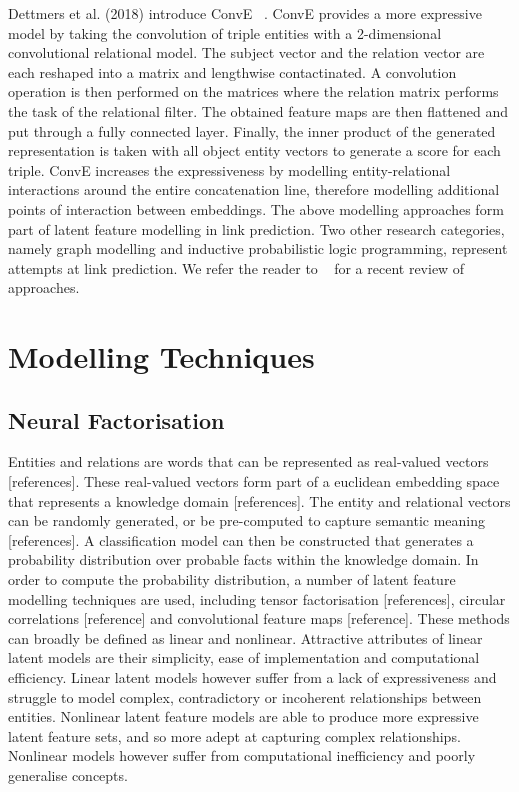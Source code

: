 Dettmers et al. (2018) introduce ConvE ~\citep{dettmers2018convolutional}. ConvE provides a more expressive model by taking the convolution of triple entities with a 2-dimensional convolutional relational model. The subject vector and the relation vector are each reshaped into a matrix and lengthwise contactinated. A convolution operation is then performed on the matrices where the relation matrix performs the task of the relational filter. The obtained feature maps are then flattened and put through a fully connected layer. Finally, the inner product of the generated representation is taken with all object entity vectors to generate a score for each triple. ConvE  increases the expressiveness by modelling entity-relational interactions  around the entire concatenation line, therefore modelling additional points of interaction between embeddings. \newline
The above modelling approaches form part of latent feature modelling in link prediction. Two other research categories, namely graph modelling and inductive probabilistic logic programming, represent attempts at link prediction. We refer the reader to ~\citep{nickel2015review} for a recent review of approaches. 



\section{Modelling Techniques} %

\subsection{Neural Factorisation} %
Entities and relations are words that can be represented as real-valued vectors [references]. These real-valued vectors form part of a euclidean embedding space that represents a knowledge domain [references]. The entity and relational vectors can be randomly generated, or be pre-computed to capture semantic meaning [references]. A classification model can then be constructed that generates a probability distribution over probable facts within the knowledge domain. In order to compute the probability distribution, a number of latent feature modelling techniques are used, including tensor factorisation [references], circular correlations [reference] and convolutional feature maps [reference]. These methods can broadly be defined as linear and nonlinear. Attractive attributes of linear latent models are their simplicity, ease of implementation and computational efficiency. Linear latent models however suffer from a lack of expressiveness and struggle to model complex, contradictory or incoherent relationships between entities. Nonlinear latent feature models are able to produce more expressive latent feature sets, and so more adept at capturing complex relationships. Nonlinear models however suffer from computational inefficiency and poorly generalise concepts. \newline
